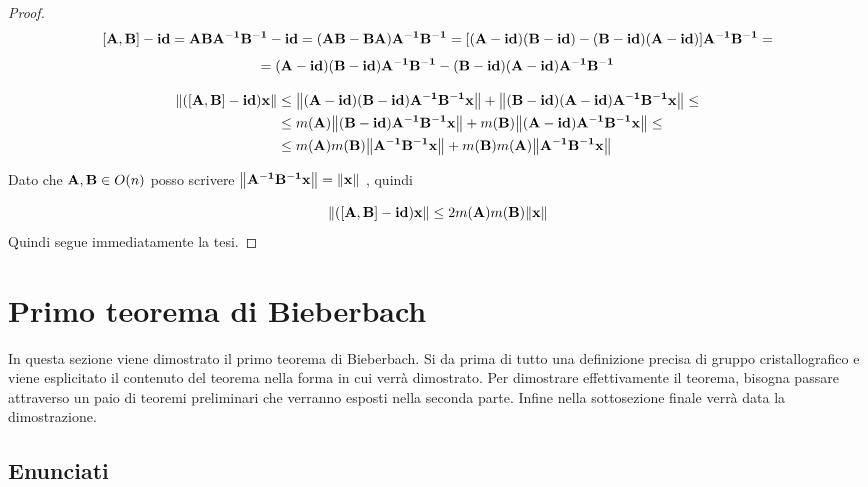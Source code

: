 \documentclass[10pt,a4paper]{book}
\begin{document}
\begin{proof}



\[ [\vb{A,B}] - \vb{id} = \vb{ABA^{-1}B^{-1} - id }= \vb{(AB -BA)A^{-1}B^{-1} }= [ \vb{ (A-id)(B-id) - (B-id)(A-id)}] \vb{A^{-1}B^{-1}} = \]
 \[  = \vb{( A-id)(B-id) A^{-1}B^{-1} -  (B-id)(A-id) A^{-1}B^{-1}} \]
 
 
 \begin{equation} 
\begin{split}
\norm{\vb{([A,B] - id )x}} & \leq \norm{\vb{ ( A-id)(B-id) A^{-1}B^{-1}x}} +  \norm{\vb{(B-id)(A-id) A^{-1}B^{-1}x}} \leq \\
& \leq m(\vb{A}) \norm{\vb{(B-id) A^{-1}B^{-1}x}} + m(\vb{B}) \norm{\vb{(A-id) A^{-1}B^{-1}x}} \leq \\ 
& \leq m(\vb{A})m(\vb{B})\norm{\vb{A^{-1}B^{-1}x}} + m(\vb{B})m(\vb{A}) \norm{\vb{A^{-1}B^{-1}x}}
\end{split}
\end{equation}

Dato che $ \vb{A,B} \in O(n)$ posso scrivere $\norm{\vb{A^{-1}B^{-1}x}} = \norm{\vb{x}} $ , quindi 

\begin{equation}
  \norm{\vb{([A,B] - id )x}}  \leq 2m(\vb{A})m(\vb{B})\norm{\vb{x}}
\end{equation} 
Quindi segue immediatamente la tesi. 
\end{proof}

\section{Primo teorema di Bieberbach}

In questa sezione viene dimostrato il primo teorema di Bieberbach. Si da prima di tutto una definizione precisa di gruppo cristallografico e viene esplicitato il contenuto del teorema nella forma in cui verrà dimostrato. 
Per dimostrare effettivamente il teorema, bisogna passare attraverso un paio di teoremi preliminari che verranno esposti nella seconda parte. Infine nella sottosezione finale verrà data la dimostrazione.  \\

\subsection{Enunciati}
\end{document}
